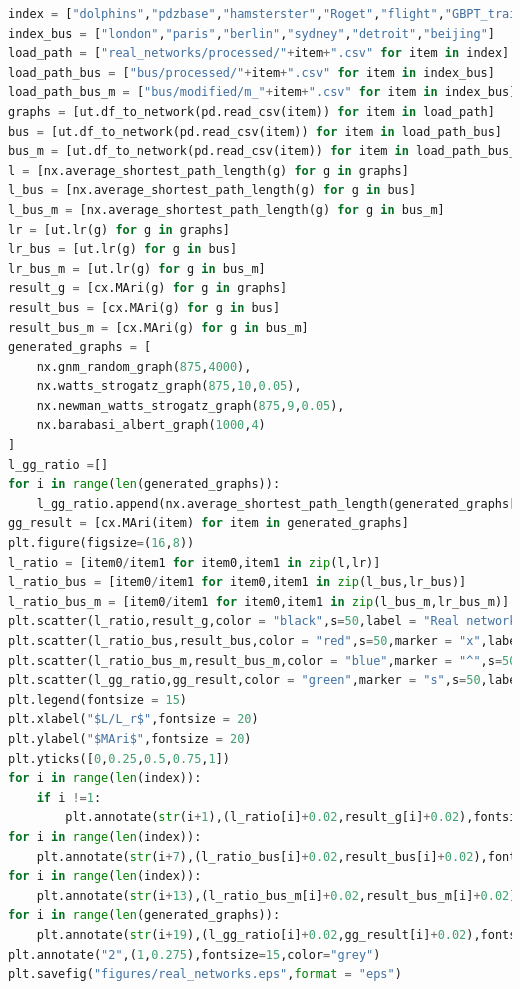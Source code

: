 \documentclass[12pt]{article}
\begin{document}
\begin{lstlisting}[breaklines=true,language=Python]
index = ["dolphins","pdzbase","hamsterster","Roget","flight","GBPT_train"]
index_bus = ["london","paris","berlin","sydney","detroit","beijing"]
load_path = ["real_networks/processed/"+item+".csv" for item in index]
load_path_bus = ["bus/processed/"+item+".csv" for item in index_bus]
load_path_bus_m = ["bus/modified/m_"+item+".csv" for item in index_bus]
graphs = [ut.df_to_network(pd.read_csv(item)) for item in load_path]
bus = [ut.df_to_network(pd.read_csv(item)) for item in load_path_bus]
bus_m = [ut.df_to_network(pd.read_csv(item)) for item in load_path_bus_m]
l = [nx.average_shortest_path_length(g) for g in graphs]       
l_bus = [nx.average_shortest_path_length(g) for g in bus]
l_bus_m = [nx.average_shortest_path_length(g) for g in bus_m]
lr = [ut.lr(g) for g in graphs]
lr_bus = [ut.lr(g) for g in bus]
lr_bus_m = [ut.lr(g) for g in bus_m]
result_g = [cx.MAri(g) for g in graphs]
result_bus = [cx.MAri(g) for g in bus]
result_bus_m = [cx.MAri(g) for g in bus_m]
generated_graphs = [
    nx.gnm_random_graph(875,4000),
    nx.watts_strogatz_graph(875,10,0.05),
    nx.newman_watts_strogatz_graph(875,9,0.05),
    nx.barabasi_albert_graph(1000,4)
]
l_gg_ratio =[]
for i in range(len(generated_graphs)):
    l_gg_ratio.append(nx.average_shortest_path_length(generated_graphs[i])/ut.lr(generated_graphs[i]))
gg_result = [cx.MAri(item) for item in generated_graphs]
plt.figure(figsize=(16,8))
l_ratio = [item0/item1 for item0,item1 in zip(l,lr)]
l_ratio_bus = [item0/item1 for item0,item1 in zip(l_bus,lr_bus)]
l_ratio_bus_m = [item0/item1 for item0,item1 in zip(l_bus_m,lr_bus_m)]
plt.scatter(l_ratio,result_g,color = "black",s=50,label = "Real networks")
plt.scatter(l_ratio_bus,result_bus,color = "red",s=50,marker = "x",label ="Bus networks")
plt.scatter(l_ratio_bus_m,result_bus_m,color = "blue",marker = "^",s=50,label = "Modified bus networks")
plt.scatter(l_gg_ratio,gg_result,color = "green",marker = "s",s=50,label = "Generated graphs")
plt.legend(fontsize = 15)
plt.xlabel("$L/L_r$",fontsize = 20)
plt.ylabel("$MAri$",fontsize = 20)
plt.yticks([0,0.25,0.5,0.75,1])
for i in range(len(index)):
    if i !=1:
        plt.annotate(str(i+1),(l_ratio[i]+0.02,result_g[i]+0.02),fontsize= 15,color = "grey")
for i in range(len(index)):
    plt.annotate(str(i+7),(l_ratio_bus[i]+0.02,result_bus[i]+0.02),fontsize= 15,color = "grey")
for i in range(len(index)):
    plt.annotate(str(i+13),(l_ratio_bus_m[i]+0.02,result_bus_m[i]+0.02),fontsize= 15,color = "grey")
for i in range(len(generated_graphs)):
    plt.annotate(str(i+19),(l_gg_ratio[i]+0.02,gg_result[i]+0.02),fontsize= 15,color = "grey")
plt.annotate("2",(1,0.275),fontsize=15,color="grey")
plt.savefig("figures/real_networks.eps",format = "eps")
\end{lstlisting}
\end{document}
